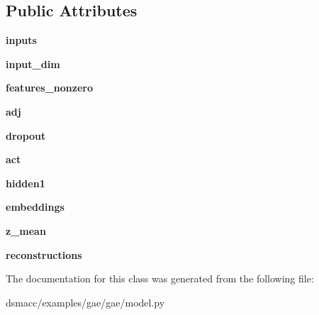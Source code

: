 \subsection*{Public Attributes}
\begin{DoxyCompactItemize}
\item 
\mbox{\label{classgae_1_1model_1_1GCNModelAE_afcb509662028b94e69e6a3a400b1322d}} 
{\bfseries inputs}
\item 
\mbox{\label{classgae_1_1model_1_1GCNModelAE_a45af2b1325f53e917a55ee279a41a31c}} 
{\bfseries input\+\_\+dim}
\item 
\mbox{\label{classgae_1_1model_1_1GCNModelAE_afb90b73d88e1e02fc15ae20dd97f8e19}} 
{\bfseries features\+\_\+nonzero}
\item 
\mbox{\label{classgae_1_1model_1_1GCNModelAE_a367a63829a6243cb8b5e1ed8a98c5699}} 
{\bfseries adj}
\item 
\mbox{\label{classgae_1_1model_1_1GCNModelAE_a7ff285e7be07ac02ca3321986422340e}} 
{\bfseries dropout}
\item 
\mbox{\label{classgae_1_1model_1_1GCNModelAE_a5d4253b6ff31414a16f4adf604019551}} 
{\bfseries act}
\item 
\mbox{\label{classgae_1_1model_1_1GCNModelAE_a5434ad5b153b2cab4d8ba0d739669311}} 
{\bfseries hidden1}
\item 
\mbox{\label{classgae_1_1model_1_1GCNModelAE_a6ee32a743b0d6452bfac936c505bd73d}} 
{\bfseries embeddings}
\item 
\mbox{\label{classgae_1_1model_1_1GCNModelAE_a73c3a252fa2d705fb7b0849de42ebfe1}} 
{\bfseries z\+\_\+mean}
\item 
\mbox{\label{classgae_1_1model_1_1GCNModelAE_a024fcebf56c0d0860f1bc198883705f7}} 
{\bfseries reconstructions}
\end{DoxyCompactItemize}


The documentation for this class was generated from the following file\+:\begin{DoxyCompactItemize}
\item 
dsmacc/examples/gae/gae/model.\+py\end{DoxyCompactItemize}
